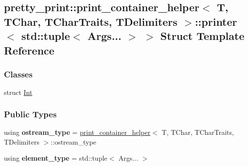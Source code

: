 \hypertarget{structpretty__print_1_1print__container__helper_1_1printer_3_01std_1_1tuple_3_01Args_8_8_8_01_4_01_4}{}\subsection{pretty\+\_\+print\+:\+:print\+\_\+container\+\_\+helper$<$ T, T\+Char, T\+Char\+Traits, T\+Delimiters $>$\+:\+:printer$<$ std\+:\+:tuple$<$ Args... $>$ $>$ Struct Template Reference}
\label{structpretty__print_1_1print__container__helper_1_1printer_3_01std_1_1tuple_3_01Args_8_8_8_01_4_01_4}
\subsubsection*{Classes}
\begin{DoxyCompactItemize}
\item 
struct \hyperlink{structpretty__print_1_1print__container__helper_1_1printer_3_01std_1_1tuple_3_01Args_8_8_8_01_4_01_4_1_1Int}{Int}
\end{DoxyCompactItemize}
\subsubsection*{Public Types}
\begin{DoxyCompactItemize}
\item 
using {\bfseries ostream\+\_\+type} = \hyperlink{structpretty__print_1_1print__container__helper}{print\+\_\+container\+\_\+helper}$<$ T, T\+Char, T\+Char\+Traits, T\+Delimiters $>$\+::ostream\+\_\+type\hypertarget{structpretty__print_1_1print__container__helper_1_1printer_3_01std_1_1tuple_3_01Args_8_8_8_01_4_01_4_a8960836b6a7b116f7db0f7254cd91598}{}\label{structpretty__print_1_1print__container__helper_1_1printer_3_01std_1_1tuple_3_01Args_8_8_8_01_4_01_4_a8960836b6a7b116f7db0f7254cd91598}

\item 
using {\bfseries element\+\_\+type} = std\+::tuple$<$ Args... $>$\hypertarget{structpretty__print_1_1print__container__helper_1_1printer_3_01std_1_1tuple_3_01Args_8_8_8_01_4_01_4_abb6040ec0501ed0cb952e635627fc0ca}{}\label{structpretty__print_1_1print__container__helper_1_1printer_3_01std_1_1tuple_3_01Args_8_8_8_01_4_01_4_abb6040ec0501ed0cb952e635627fc0ca}

\end{DoxyCompactItemize}

